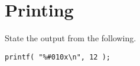
\chapter{Printing}


\begin{example}
State the output from the following.

\begin{lstlisting}
printf( "%#010x\n", 12 );
\end{lstlisting}

\end{example}